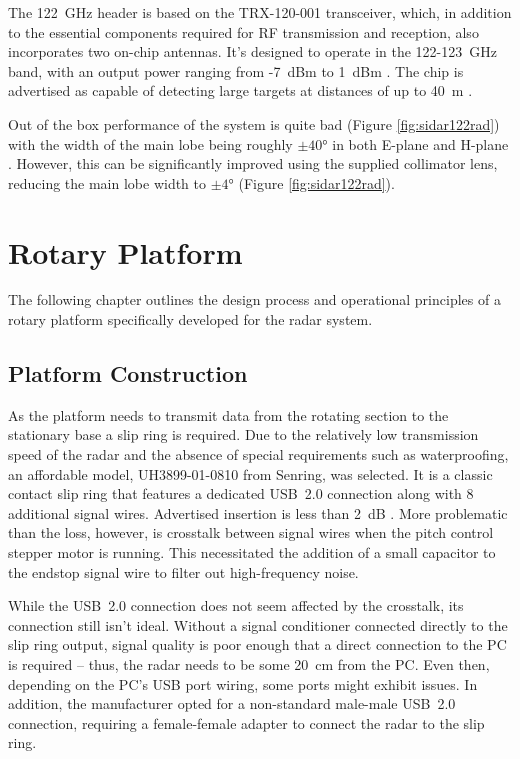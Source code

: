 The 122~GHz header is based on the TRX-120-001 transceiver, which, in addition to the essential components required for RF transmission and reception, also incorporates two on-chip antennas.
It's designed to operate in the 122-123~GHz band, with an output power ranging from -7~dBm to 1~dBm \cite{sidarTRX122}.
The chip is advertised as capable of detecting large targets at distances of up to 40~m \cite{sidarMANOld}.

Out of the box performance of the system is quite bad (Figure \ref{fig:sidar122rad}) with the width of the main lobe being roughly $\pm40\text{°}$ in both E-plane and H-plane \cite{sidarTRX122}.
However, this can be significantly improved using the supplied collimator lens, reducing the main lobe width to $\pm4\text{°}$ \cite{sidarTRX122col} (Figure \ref{fig:sidar122rad}).



\chapter{Rotary Platform}

The following chapter outlines the design process and operational principles of a rotary platform specifically developed for the \sidar radar system.


\section{Platform Construction}

As the platform needs to transmit data from the rotating section to the stationary base a slip ring is required.
Due to the relatively low transmission speed of the radar and the absence of special requirements such as waterproofing, an affordable model, UH3899-01-0810 from Senring, was selected.
It is a classic contact slip ring that features a dedicated USB~2.0 connection along with 8 additional signal wires.
Advertised insertion is less than 2~dB \cite{slipring}.
More problematic than the loss, however, is crosstalk between signal wires when the pitch control stepper motor is running.
This necessitated the addition of a small capacitor to the endstop signal wire to filter out high-frequency noise.

While the USB~2.0 connection does not seem affected by the crosstalk, its connection still isn't ideal.
Without a signal conditioner connected directly to the slip ring output, signal quality is poor enough that a direct connection to the PC is required -- thus, the radar needs to be some 20~cm from the PC.
Even then, depending on the PC's USB port wiring, some ports might exhibit issues.
In addition, the manufacturer opted for a non-standard male-male USB~2.0 connection, requiring a female-female adapter to connect the radar to the slip ring.

